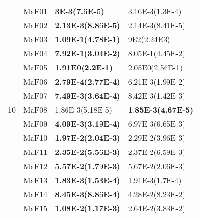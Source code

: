 \documentclass[]{article}
\begin{document}
\begin{table}
\begin{footnotesize}
\begin{tabular}{|l|l|l|l|}
\multirow{15}{*}{10} & MaF01 & \cellcolor{gray95} {\bf 3E-3(7.6E-5)} & 3.16E-3(1.3E-4)\\
 & MaF02 & \cellcolor{gray95} {\bf 2.13E-3(8.86E-5)} & \cellcolor{gray95} 2.14E-3(8.41E-5)\\
 & MaF03 & \cellcolor{gray95} {\bf 1.09E-1(4.78E-1)} & 9E2(2.24E3)\\
 & MaF04 & \cellcolor{gray95} {\bf 7.92E-1(3.04E-2)} & \cellcolor{gray95} 8.05E-1(4.45E-2)\\
 & MaF05 & \cellcolor{gray95} {\bf 1.91E0(2.2E-1)} & \cellcolor{gray95} 2.05E0(2.56E-1)\\
 & MaF06 & \cellcolor{gray95} {\bf 2.79E-4(2.77E-4)} & 6.21E-3(1.99E-2)\\
 & MaF07 & \cellcolor{gray95} {\bf 7.49E-3(3.64E-4)} & 8.42E-3(1.42E-3)\\
 & MaF08 & \cellcolor{gray95} 1.86E-3(5.18E-5) & \cellcolor{gray95} {\bf 1.85E-3(4.67E-5)}\\
 & MaF09 & \cellcolor{gray95} {\bf 4.09E-3(3.19E-4)} & \cellcolor{gray95} 6.97E-3(6.65E-3)\\
 & MaF10 & \cellcolor{gray95} {\bf 1.97E-2(2.04E-3)} & 2.29E-2(3.96E-3)\\
 & MaF11 & \cellcolor{gray95} {\bf 2.35E-2(5.56E-3)} & \cellcolor{gray95} 2.37E-2(6.59E-3)\\
 & MaF12 & \cellcolor{gray95} {\bf 5.57E-2(1.79E-3)} & \cellcolor{gray95} 5.67E-2(2.06E-3)\\
 & MaF13 & \cellcolor{gray95} {\bf 1.83E-3(1.53E-4)} & \cellcolor{gray95} 1.91E-3(1.7E-4)\\
 & MaF14 & \cellcolor{gray95} {\bf 8.45E-3(8.86E-4)} & \cellcolor{gray95} 4.28E-2(8.23E-2)\\
 & MaF15 & \cellcolor{gray95} {\bf 1.08E-2(1.17E-3)} & \cellcolor{gray95} 2.64E-2(3.83E-2)\\
\hline


\end{tabular}
\end{footnotesize}
\end{table}
\end{document}
